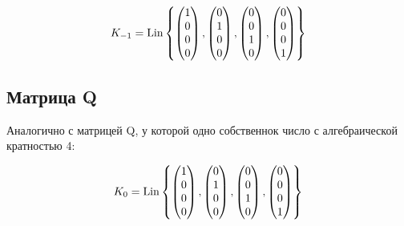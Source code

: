 \documentclass[12pt, a4paper]{article}
\begin{document}
    \begin{equation}
        K_{-1} = \operatorname{Lin} \left\{ \begin{pmatrix} 1\\0\\0\\0 \end{pmatrix}, \begin{pmatrix} 0\\1\\0\\0 \end{pmatrix}, \begin{pmatrix} 0\\0\\1\\0 \end{pmatrix}, \begin{pmatrix} 0\\0\\0\\1 \end{pmatrix}  \right\}
    \end{equation}

    \subsection{Матрица Q}

    Аналогично с матрицей Q, у которой одно собственнок число с алгебраической кратностью 4:

    \begin{equation}
        K_{0} = \operatorname{Lin} \left\{ \begin{pmatrix} 1\\0\\0\\0 \end{pmatrix}, \begin{pmatrix} 0\\1\\0\\0 \end{pmatrix}, \begin{pmatrix} 0\\0\\1\\0 \end{pmatrix}, \begin{pmatrix} 0\\0\\0\\1 \end{pmatrix}  \right\}
    \end{equation}
\end{document}
